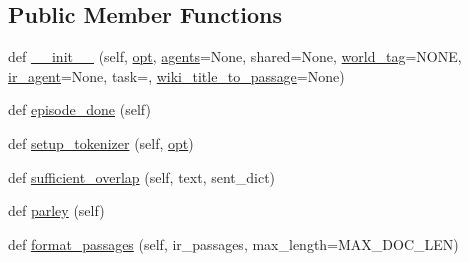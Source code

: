 \subsection*{Public Member Functions}
\begin{DoxyCompactItemize}
\item 
def \hyperlink{classparlai_1_1mturk_1_1tasks_1_1wizard__of__wikipedia_1_1worlds_1_1MTurkWizardOfWikipediaWorld_ae471a27f4c1d70786c2e56d99923cbbc}{\+\_\+\+\_\+init\+\_\+\+\_\+} (self, \hyperlink{classparlai_1_1core_1_1worlds_1_1World_a3640d92718acd3e6942a28c1ab3678bd}{opt}, \hyperlink{classparlai_1_1mturk_1_1tasks_1_1wizard__of__wikipedia_1_1worlds_1_1MTurkWizardOfWikipediaWorld_a1d8322b60328d9bee28d25ff2b55db27}{agents}=None, shared=None, \hyperlink{classparlai_1_1mturk_1_1tasks_1_1wizard__of__wikipedia_1_1worlds_1_1MTurkWizardOfWikipediaWorld_ae3c5ecb7dfbcfd5ede55035fa23d3722}{world\+\_\+tag}=\textquotesingle{}N\+O\+NE\textquotesingle{}, \hyperlink{classparlai_1_1mturk_1_1tasks_1_1wizard__of__wikipedia_1_1worlds_1_1MTurkWizardOfWikipediaWorld_ac96038e69b3b922033d73ebeb0db5b5f}{ir\+\_\+agent}=None, task=\textquotesingle{}\textquotesingle{}, \hyperlink{classparlai_1_1mturk_1_1tasks_1_1wizard__of__wikipedia_1_1worlds_1_1MTurkWizardOfWikipediaWorld_a21df7304f22e93830b5e92f43c2ac734}{wiki\+\_\+title\+\_\+to\+\_\+passage}=None)
\item 
def \hyperlink{classparlai_1_1mturk_1_1tasks_1_1wizard__of__wikipedia_1_1worlds_1_1MTurkWizardOfWikipediaWorld_a23df3f443cac50eb830f196136310fa9}{episode\+\_\+done} (self)
\item 
def \hyperlink{classparlai_1_1mturk_1_1tasks_1_1wizard__of__wikipedia_1_1worlds_1_1MTurkWizardOfWikipediaWorld_aa6d7a37b43c8485c33a1c62801f41a5f}{setup\+\_\+tokenizer} (self, \hyperlink{classparlai_1_1core_1_1worlds_1_1World_a3640d92718acd3e6942a28c1ab3678bd}{opt})
\item 
def \hyperlink{classparlai_1_1mturk_1_1tasks_1_1wizard__of__wikipedia_1_1worlds_1_1MTurkWizardOfWikipediaWorld_ac5774d235722eef3721845e5cc4ad588}{sufficient\+\_\+overlap} (self, text, sent\+\_\+dict)
\item 
def \hyperlink{classparlai_1_1mturk_1_1tasks_1_1wizard__of__wikipedia_1_1worlds_1_1MTurkWizardOfWikipediaWorld_a3b3cf41071bac1da0053627118f61d58}{parley} (self)
\item 
def \hyperlink{classparlai_1_1mturk_1_1tasks_1_1wizard__of__wikipedia_1_1worlds_1_1MTurkWizardOfWikipediaWorld_af958525c324060fbbe27d614c49a1dfc}{format\+\_\+passages} (self, ir\+\_\+passages, max\+\_\+length=M\+A\+X\+\_\+\+D\+O\+C\+\_\+\+L\+EN)

\end{DoxyCompactItemize}
